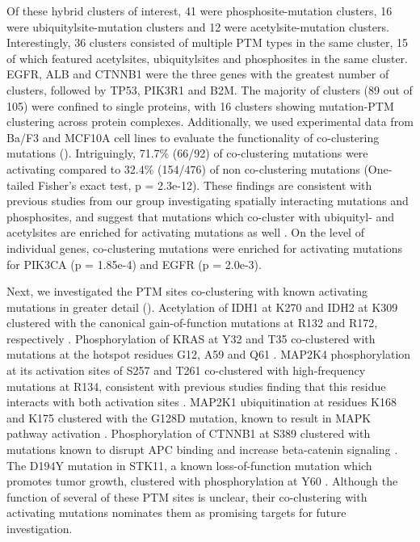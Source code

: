 Of these hybrid clusters of interest, 41 were phosphosite-mutation clusters, 16 were ubiquitylsite-mutation clusters and 12 were acetylsite-mutation clusters. Interestingly, 36 clusters consisted of multiple PTM types in the same cluster, 15 of which featured acetylsites, ubiquitylsites and phosphosites in the same cluster. EGFR, ALB and CTNNB1 were the three genes with the greatest number of clusters, followed by TP53, PIK3R1 and B2M. The majority of clusters (89 out of 105) were confined to single proteins, with 16 clusters showing mutation-PTM clustering across protein complexes. Additionally, we used experimental data from Ba/F3 and MCF10A cell lines \cite{ngpks_millsgb:SystematicFunctional2018} to evaluate the functionality of co-clustering mutations (). Intriguingly, 71.7\% (66/92) of co-clustering mutations were activating compared to 32.4\% (154/476) of non co-clustering mutations (One-tailed Fisher's exact test, p = 2.3e-12). These findings are consistent with previous studies from our group investigating spatially interacting mutations and phosphosites, and suggest that mutations which co-cluster with ubiquityl- and acetylsites are enriched for activating mutations as well \cite{huangk_dingl:SpatiallyInteracting2021}. On the level of individual genes, co-clustering mutations were enriched for activating mutations for PIK3CA (p = 1.85e-4) and EGFR (p = 2.0e-3).

Next, we investigated the PTM sites co-clustering with known activating mutations in greater detail (). Acetylation of IDH1 at K270 and IDH2 at K309 clustered with the canonical gain-of-function mutations at R132 and R172, respectively \cite{dangl_susm:CancerassociatedIDH12009,lemonnierf_maktw:IDH2R172K2016}. Phosphorylation of KRAS at Y32 and T35 co-clustered with mutations at the hotspot residues G12, A59 and Q61 \cite{hobbsga_rossmankl:RASIsoforms2016}. MAP2K4 phosphorylation at its activation sites of S257 and T261 co-clustered with high-frequency mutations at R134, consistent with previous studies finding that this residue interacts with both activation sites \cite{shevchenkoe_pantsart:AutoinhibitedState2020}. MAP2K1 ubiquitination at residues K168 and K175 clustered with the G128D mutation, known to result in MAPK pathway activation \cite{gaoj_sanderc:3DClusters2017}. Phosphorylation of CTNNB1 at S389 clustered with mutations known to disrupt APC binding and increase beta-catenin signaling \cite{liup_smitsr:OncogenicMutations2020}. The D194Y mutation in STK11, a known loss-of-function mutation which promotes tumor growth, clustered with phosphorylation at Y60 \cite{granado-martinezp_recioja:STK11LKB12020}. Although the function of several of these PTM sites is unclear, their co-clustering with activating mutations nominates them as promising targets for future investigation.

